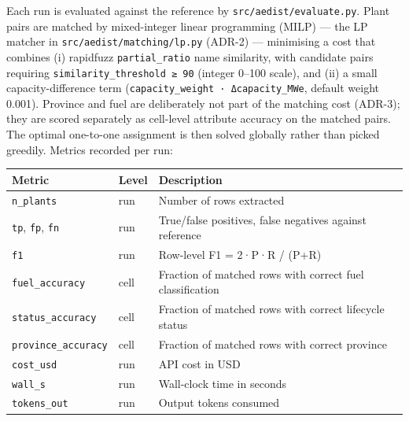 \documentclass[a4paper,11pt]{article}
\begin{document}
Each run is evaluated against the reference by
\texttt{src/aedist/evaluate.py}. Plant pairs are matched by
mixed-integer linear programming (MILP) --- the LP matcher in
\texttt{src/aedist/matching/lp.py} (ADR-2) --- minimising a cost that
combines (i) rapidfuzz \texttt{partial\_ratio} name similarity, with
candidate pairs requiring \texttt{similarity\_threshold\ ≥\ 90} (integer
0--100 scale), and (ii) a small capacity-difference term
(\texttt{capacity\_weight\ ·\ \textbar{}Δcapacity\_MWe\textbar{}},
default weight 0.001). Province and fuel are deliberately not part of
the matching cost (ADR-3); they are scored separately as cell-level
attribute accuracy on the matched pairs. The optimal one-to-one
assignment is then solved globally rather than picked greedily. Metrics
recorded per run:

\begin{longtable}[]{@{}
  >{\raggedright\arraybackslash}p{}
  >{\raggedright\arraybackslash}p{}
  >{\raggedright\arraybackslash}p{}@{}}
\toprule\noalign{}
\begin{minipage}[b]{\linewidth}\raggedright
Metric
\end{minipage} & \begin{minipage}[b]{\linewidth}\raggedright
Level
\end{minipage} & \begin{minipage}[b]{\linewidth}\raggedright
Description
\end{minipage} \\
\midrule\noalign{}
\endhead
\bottomrule\noalign{}
\endlastfoot
\texttt{n\_plants} & run & Number of rows extracted \\
\texttt{tp}, \texttt{fp}, \texttt{fn} & run & True/false positives,
false negatives against reference \\
\texttt{f1} & run & Row-level F1 = 2·P·R / (P+R) \\
\texttt{fuel\_accuracy} & cell & Fraction of matched rows with correct
fuel classification \\
\texttt{status\_accuracy} & cell & Fraction of matched rows with correct
lifecycle status \\
\texttt{province\_accuracy} & cell & Fraction of matched rows with
correct province \\
\texttt{cost\_usd} & run & API cost in USD \\
\texttt{wall\_s} & run & Wall-clock time in seconds \\
\texttt{tokens\_out} & run & Output tokens consumed \\
\end{longtable}
\end{document}
